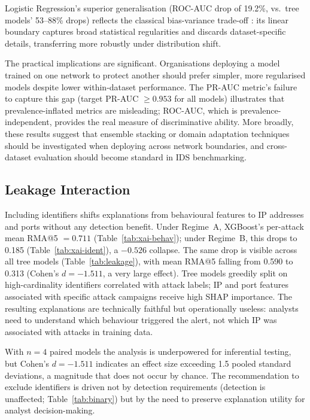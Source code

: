 \documentclass[12pt,a4paper]{report}
\begin{document}
Logistic Regression's superior generalisation (ROC-AUC drop of 19.2\%, vs.\ tree models' 53--88\% drops) reflects the classical bias-variance trade-off \cite{breiman2001}: its linear boundary captures broad statistical regularities and discards dataset-specific details, transferring more robustly under distribution shift.

The practical implications are significant. Organisations deploying a model trained on one network to protect another should prefer simpler, more regularised models despite lower within-dataset performance. The PR-AUC metric's failure to capture this gap (target PR-AUC $\geq 0.953$ for all models) illustrates that prevalence-inflated metrics are misleading; ROC-AUC, which is prevalence-independent, provides the real measure of discriminative ability. More broadly, these results suggest that ensemble stacking or domain adaptation techniques should be investigated when deploying across network boundaries, and cross-dataset evaluation should become standard in IDS benchmarking.

\subsection{Leakage Interaction}
\label{sec:disc-leakage}

Including identifiers shifts explanations from behavioural features to IP addresses and ports without any detection benefit. Under Regime~A, XGBoost's per-attack mean RMA@5 $= 0.711$ (Table~\ref{tab:xai-behav}); under Regime~B, this drops to 0.185 (Table~\ref{tab:xai-ident}), a $-0.526$ collapse. The same drop is visible across all tree models (Table~\ref{tab:leakage}), with mean RMA@5 falling from 0.590 to 0.313 (Cohen's $d = -1.511$, a very large effect). Tree models greedily split on high-cardinality identifiers correlated with attack labels; IP and port features associated with specific attack campaigns receive high SHAP importance. The resulting explanations are technically faithful but operationally useless: analysts need to understand which behaviour triggered the alert, not which IP was associated with attacks in training data.

With $n = 4$ paired models the analysis is underpowered for inferential testing, but Cohen's $d = -1.511$ indicates an effect size exceeding 1.5 pooled standard deviations, a magnitude that does not occur by chance. The recommendation to exclude identifiers is driven not by detection requirements (detection is unaffected; Table~\ref{tab:binary}) but by the need to preserve explanation utility for analyst decision-making.
\end{document}
